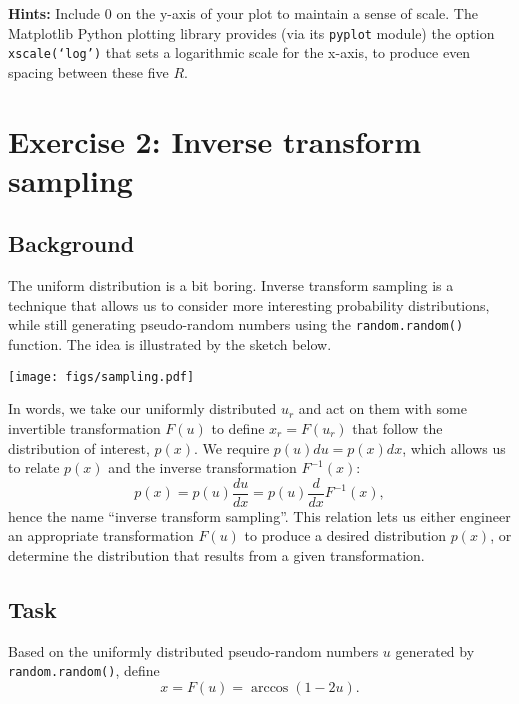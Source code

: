 \documentclass[12 pt]{article} %
\newcommand{\showmarks}[1]{\rightline{\texttt{[#1 marks]}}} %
\begin{document}
\textbf{Hints:} Include $0$ on the y-axis of your plot to maintain a sense of scale.
The Matplotlib Python plotting library provides (via its \texttt{pyplot} module) the option \texttt{xscale(`log')} that sets a logarithmic scale for the x-axis, to produce even spacing between these five $R$.

\showmarks{8}
\vfill



\section*{Exercise 2: Inverse transform sampling}
\subsection*{Background}
The uniform distribution is a bit boring.
Inverse transform sampling is a technique that allows us to consider more interesting probability distributions, while still generating pseudo-random numbers using the \texttt{random.random()} function.
The idea is illustrated by the sketch below.
\begin{center}
  \texttt{[image: figs/sampling.pdf]}
\end{center}

In words, we take our uniformly distributed $u_r$ and act on them with some invertible transformation $F(u)$ to define $x_r = F(u_r)$ that follow the distribution of interest, $p(x)$.
We require $p(u) du = p(x) dx$, which allows us to relate $p(x)$ and the inverse transformation $F^{-1}(x)$:
\begin{equation*}
  p(x) = p(u) \frac{du}{dx} = p(u) \frac{d}{dx} F^{-1}(x),
\end{equation*}
hence the name ``inverse transform sampling''.
This relation lets us either engineer an appropriate transformation $F(u)$ to produce a desired distribution $p(x)$, or determine the distribution that results from a given transformation.

\newpage
\subsection*{Task}
Based on the uniformly distributed pseudo-random numbers $u$ generated by \texttt{random.random()}, define
\begin{equation}
  \label{eq:transform}
  x = F(u) = \arccos\left(1 - 2u\right).
\end{equation}
\end{document}
